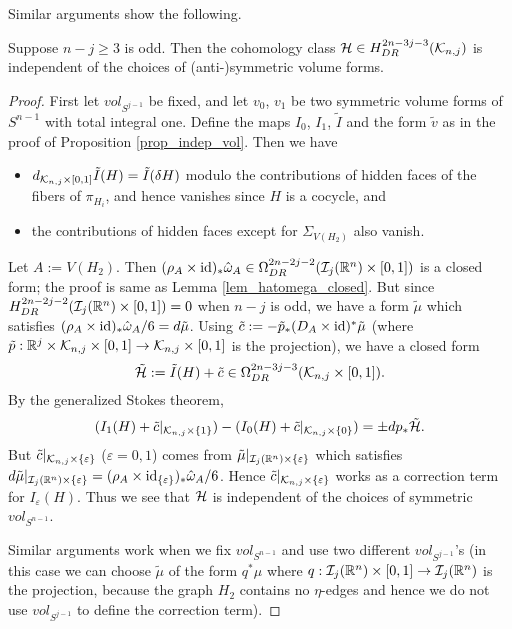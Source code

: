 Similar arguments show the following.


\begin{lem}\label{lem_indep_H_vol}
Suppose $n-j \ge 3$ is odd.
Then the cohomology class $\mathcal{H} \in H^{2n-3j-3}_{DR}(\mathcal{K}_{n ,j})$ is independent of the choices of (anti-)symmetric
volume forms.
\end{lem}


\begin{proof}
First let $vol_{S^{j-1}}$ be fixed, and let $v_0$, $v_1$ be two symmetric volume forms of $S^{n-1}$ with total integral
one.
Define the maps $I_0$, $I_1$, $\tilde{I}$ and the form $\tilde{v}$ as in the proof of Proposition \ref{prop_indep_vol}.
Then we have
\begin{itemize}
\item $d_{\mathcal{K}_{n ,j}\times [0,1]}\tilde{I}(H) = \tilde{I}(\delta H)$ modulo the contributions of hidden
faces of the fibers of $\pi_{H_i}$, and hence vanishes since $H$ is a cocycle, and
\item the contributions of hidden faces except for $\Sigma_{V(H_2 )}$ also vanish.
\end{itemize}
Let $A:=V(H_2 )$.
Then $(\rho_A \times \mathrm{id} )_* \hat{\omega}_A \in \Omega^{2n-2j-2}_{DR}(\mathcal{I}_j (\mathbb{R}^n )\times [0,1])$ is a closed form;
the proof is same as Lemma \ref{lem_hatomega_closed}.
But since $H^{2n-2j-2}_{DR}(\mathcal{I}_j (\mathbb{R}^n )\times [0,1])=0$ when $n-j$ is odd, we have a form $\tilde{\mu}$ which satisfies
$(\rho_A \times \mathrm{id} )_* \hat{\omega}_A /6=d\tilde{\mu}$.
Using $\tilde{c}:=-\tilde{p}_* (D_A \times \mathrm{id} )^* \tilde{\mu}$ (where
$\tilde{p}:\mathbb{R}^j \times \mathcal{K}_{n ,j}\times [0,1]\to \mathcal{K}_{n ,j}\times [0,1]$ is the projection), we have a closed form
\[
 \tilde{\mathcal{H}}:=\tilde{I}(H)+\tilde{c} \in \Omega^{2n-3j-3}_{DR}(\mathcal{K}_{n ,j} \times [0,1]).
\]
By the generalized Stokes theorem,
\[
 (I_1 (H)+\tilde{c}|_{\mathcal{K}_{n ,j}\times \{ 1\}}) - (I_0 (H)+\tilde{c}|_{\mathcal{K}_{n ,j}\times \{ 0\}}) =\pm d p_* \tilde{\mathcal{H}}.
\]
But $\tilde{c}|_{\mathcal{K}_{n ,j}\times \{ \varepsilon \}}$ ($\varepsilon =0,1$) comes from
$\tilde{\mu}|_{\mathcal{I}_j (\mathbb{R}^n )\times \{ \varepsilon \}}$ which satisfies
$d\tilde{\mu}|_{\mathcal{I}_j (\mathbb{R}^n )\times \{ \varepsilon \}}=(\rho_A \times \mathrm{id}_{\{ \varepsilon\}})_* \hat{\omega}_A /6$.
Hence $\tilde{c}|_{\mathcal{K}_{n ,j}\times \{ \varepsilon \}}$ works as a correction term for $I_{\varepsilon}(H)$.
Thus we see that $\mathcal{H}$ is independent of the choices of symmetric $vol_{S^{n-1}}$.


Similar arguments work when we fix $vol_{S^{n-1}}$ and use two different $vol_{S^{j-1}}$'s
(in this case we can choose $\tilde{\mu}$ of the form $q^* \mu$ where $q:\mathcal{I}_j (\mathbb{R}^n )\times [0,1] \to \mathcal{I}_j (\mathbb{R}^n )$ is
the projection, because the graph $H_2$ contains no $\eta$-edges and hence we do not use $vol_{S^{j-1}}$ to define the
correction term).
\end{proof}